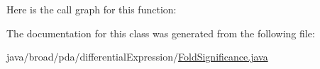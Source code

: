 Here is the call graph for this function\+:




The documentation for this class was generated from the following file\+:\begin{DoxyCompactItemize}
\item 
java/broad/pda/differential\+Expression/\hyperlink{_fold_significance_8java}{Fold\+Significance.\+java}\end{DoxyCompactItemize}
